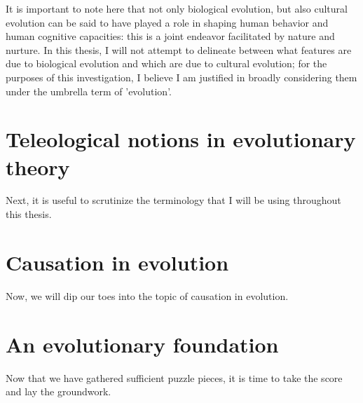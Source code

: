 It is important to note here that not only biological evolution, but also cultural evolution can be said to have played a role in shaping human behavior and human cognitive capacities: this is a joint endeavor facilitated by nature and nurture. In this thesis, I will not attempt to delineate between what features are due to biological evolution and which are due to cultural evolution; for the purposes of this investigation, I believe I am justified in broadly considering them under the umbrella term of 'evolution'.

\section{Teleological notions in evolutionary theory}

Next, it is useful to scrutinize the terminology that I will be using throughout this thesis.

\section{Causation in evolution}

Now, we will dip our toes into the topic of causation in evolution.

\section{An evolutionary foundation}

Now that we have gathered sufficient puzzle pieces, it is time to take the score and lay the groundwork.
